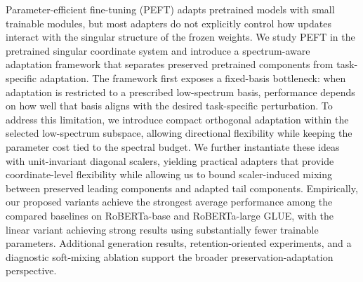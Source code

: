 Parameter-efficient fine-tuning (PEFT) adapts pretrained models with small trainable modules, but most adapters do not explicitly control how updates interact with the singular structure of the frozen weights. We study PEFT in the pretrained singular coordinate system and introduce a spectrum-aware adaptation framework that separates preserved pretrained components from task-specific adaptation. The framework first exposes a fixed-basis bottleneck: when adaptation is restricted to a prescribed low-spectrum basis, performance depends on how well that basis aligns with the desired task-specific perturbation. To address this limitation, we introduce compact orthogonal adaptation within the selected low-spectrum subspace, allowing directional flexibility while keeping the parameter cost tied to the spectral budget. We further instantiate these ideas with unit-invariant diagonal scalers, yielding practical adapters that provide coordinate-level flexibility while allowing us to bound scaler-induced mixing between preserved leading components and adapted tail components. Empirically, our proposed variants achieve the strongest average performance among the compared baselines on RoBERTa-base and RoBERTa-large GLUE, with the linear variant achieving strong results using substantially fewer trainable parameters. Additional generation results, retention-oriented experiments, and a diagnostic
soft-mixing ablation support the broader preservation-adaptation perspective.
